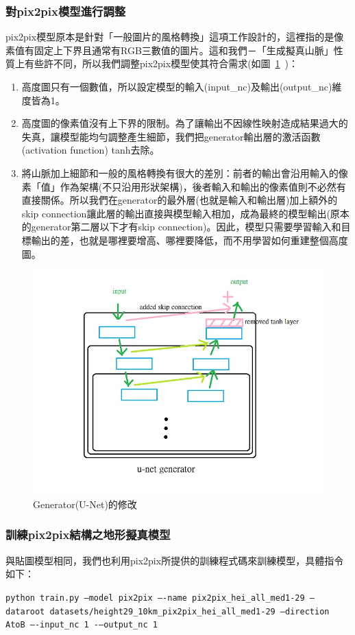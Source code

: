 \documentclass[a4paper, 12pt]{article}
\begin{document}
\subsubsection{對pix2pix模型進行調整}
pix2pix模型原本是針對「一般圖片的風格轉換」這項工作設計的，這裡指的是像素值有固定上下界且通常有RGB三數值的圖片。這和我們－「生成擬真山脈」性質上有些許不同，所以我們調整pix2pix模型使其符合需求(如圖~\ref{fig:13}~)：
\begin{enumerate}
    \item 高度圖只有一個數值，所以設定模型的輸入(input\_nc)及輸出(output\_nc)維度皆為1。
    \item 高度圖的像素值沒有上下界的限制。為了讓輸出不因線性映射造成結果過大的失真，讓模型能均勻調整產生細節，我們把generator輸出層的激活函數(activation function) tanh去除。
    \item 將山脈加上細節和一般的風格轉換有很大的差別：前者的輸出會沿用輸入的像素「值」作為架構(不只沿用形狀架構)，後者輸入和輸出的像素值則不必然有直接關係。所以我們在generator的最外層(也就是輸入和輸出層)加上額外的skip connection讓此層的輸出直接與模型輸入相加，成為最終的模型輸出(原本的generator第二層以下才有skip connection)。因此，模型只需要學習輸入和目標輸出的差，也就是哪裡要增高、哪裡要降低，而不用學習如何重建整個高度圖。
\end{enumerate}
\begin{figure}[htbp]
    \centering
    \includegraphics[width=0.5\linewidth]{fig/13.jpg}
    \caption{Generator(U-Net)的修改}
    \label{fig:13}
\end{figure}
\subsubsection{訓練pix2pix結構之地形擬真模型}
與貼圖模型相同，我們也利用pix2pix所提供的訓練程式碼來訓練模型，具體指令如下：
\begin{center}
\texttt{python train.py --model pix2pix –-name pix2pix\_hei\_all\_med1-29 --dataroot datasets/height29\_10km\_pix2pix\_hei\_all\_med1-29 --direction AtoB –-input\_nc 1 -–output\_nc 1}
\end{center}
\end{document}
